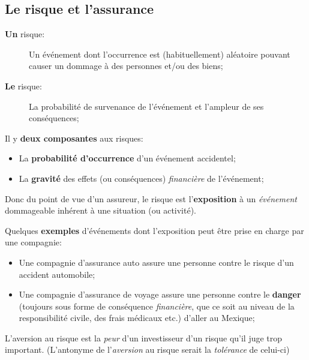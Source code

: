 \documentclass[10pt, french]{article}
\begin{document}
\begin{multicols*}{3} 
\section{Le risque et l'assurance}
\begin{definitionNOHFILL}[Risque]
\begin{description}
	\item[\textbf{Un} risque:] Un événement dont l'occurrence est (habituellement) aléatoire pouvant causer un dommage à des personnes et/ou des biens;
	\item[\textbf{Le} risque:] La probabilité de survenance de l'événement et l'ampleur de ses conséquences;
\end{description}

Il y \textbf{deux composantes} aux risques:
\begin{itemize}
	\item	La \textbf{probabilité d'occurrence} d'un événement accidentel;
	\item	La \textbf{gravité} des effets (ou conséquences) \textit{financière} de l'événement;
\end{itemize}

Donc du point de vue d'un assureur, le risque est l'\textbf{exposition} à un \textit{événement} dommageable inhérent à une situation (ou activité). 

Quelques \textbf{exemples} d'événements dont l'exposition peut être prise en charge par une compagnie:
\begin{itemize}
	\item	Une compagnie d'assurance auto assure une personne contre le risque d'un accident automobile;
	\item	Une compagnie d'assurance de voyage assure une personne contre le \textbf{danger} (toujours sous forme de conséquence \textit{financière}, que ce soit au niveau de la responsibilité civile, des frais médicaux etc.) d'aller au Mexique;
\end{itemize}
\end{definitionNOHFILL}

\begin{definitionNOHFILL}[Aversion]
L'aversion au risque est la \textit{peur} d'un investisseur d'un risque qu'il juge trop important.
(L'antonyme de l'\textit{aversion} au risque serait la \textit{tolérance} de celui-ci)


\end{definitionNOHFILL}
\end{multicols*}
\end{document}
